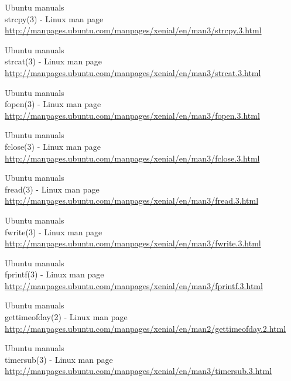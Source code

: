 \begin{thebibliography}{10}
Ubuntu manuals\\
strcpy(3) - Linux man page\\
  \url{http://manpages.ubuntu.com/manpages/xenial/en/man3/strcpy.3.html}

Ubuntu manuals\\
strcat(3) - Linux man page\\
  \url{http://manpages.ubuntu.com/manpages/xenial/en/man3/strcat.3.html}

Ubuntu manuals\\
fopen(3) - Linux man page\\
  \url{http://manpages.ubuntu.com/manpages/xenial/en/man3/fopen.3.html}

Ubuntu manuals\\
fclose(3) - Linux man page\\
  \url{http://manpages.ubuntu.com/manpages/xenial/en/man3/fclose.3.html}

Ubuntu manuals\\
fread(3) - Linux man page\\
  \url{http://manpages.ubuntu.com/manpages/xenial/en/man3/fread.3.html}

Ubuntu manuals\\
fwrite(3) - Linux man page\\
  \url{http://manpages.ubuntu.com/manpages/xenial/en/man3/fwrite.3.html}

Ubuntu manuals\\
fprintf(3) - Linux man page\\
  \url{http://manpages.ubuntu.com/manpages/xenial/en/man3/fprintf.3.html}

Ubuntu manuals\\
gettimeofday(2) - Linux man page\\
  \url{http://manpages.ubuntu.com/manpages/xenial/en/man2/gettimeofday.2.html}

Ubuntu manuals\\
timersub(3) - Linux man page\\
  \url{http://manpages.ubuntu.com/manpages/xenial/en/man3/timersub.3.html}

\end{thebibliography}
